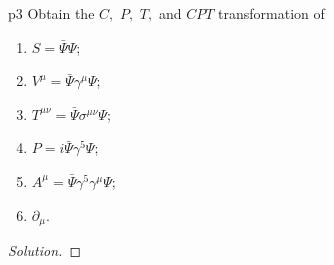 \begin{problem}{}{p3}
   Obtain the \(C,\) \(P,\) \(T,\) and \(CPT\) transformation of
   \begin{enumerate}[label=(\alph*)]
       \item \(S = \bar{\Psi} \Psi\);
       \item \(V^\mu = \bar{\Psi} \gamma^\mu \Psi\);
       \item \(T^{\mu\nu} = \bar{\Psi} \sigma^{\mu \nu} \Psi\);
       \item \(P = i \bar{\Psi} \gamma^5 \Psi\);
       \item \(A^\mu = \bar{\Psi} \gamma^5 \gamma^\mu \Psi\);
       \item \(\partial_\mu.\)
   \end{enumerate}
\end{problem}
\begin{proof}[Solution]
    
\end{proof}
